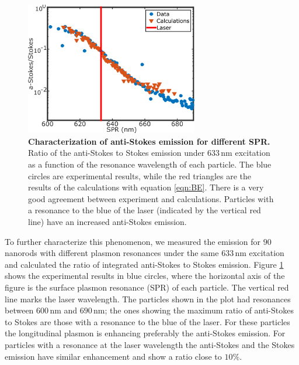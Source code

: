 \documentclass[journal=nalefd,manuscript=letter]{achemso}
\newcommand{\nm}{\ensuremath{\,\textrm{nm}}}
\begin{document}
\begin{figure}[tp] \centering
\includegraphics[width=75.5mm]{Figures/02_AS_vs_S_SPR/02_AS_vs_S_SPR.png}
\caption{\textbf{Characterization of anti-Stokes emission for different SPR.} 
Ratio of the anti-Stokes to Stokes emission under $633\nm$ excitation
as a function of the resonance wavelength of each particle.
The blue circles are experimental results, while the red triangles are the
results of the calculations with equation \ref{eqn:BE}. There is a very
good agreement between experiment and calculations. Particles with a resonance
to the blue of the laser (indicated by the vertical red line) have an increased anti-Stokes
emission.}
	\label{fig:ASS-ratio}
\end{figure}

To further characterize this phenomenon, we measured the emission for $90$
nanorods with different plasmon resonances under the same $633\nm$ excitation
and calculated the ratio of integrated anti-Stokes to Stokes emission.
Figure \ref{fig:ASS-ratio} shows the experimental results in blue circles, where
the horizontal axis of the figure is the surface plasmon resonance (SPR) of each
particle. The vertical red line marks the laser wavelength. The particles shown
in the plot had resonances between $600\nm$ and $690\nm$; the ones showing the
maximum ratio of anti-Stokes to Stokes are those with a resonance to the blue of
the laser. For these particles the longitudinal plasmon is enhancing preferably the
anti-Stokes emission. For particles with a resonance at the laser wavelength the
anti-Stokes and the Stokes emission have similar enhancement and show a ratio
close to $10\%$.
\end{document}

